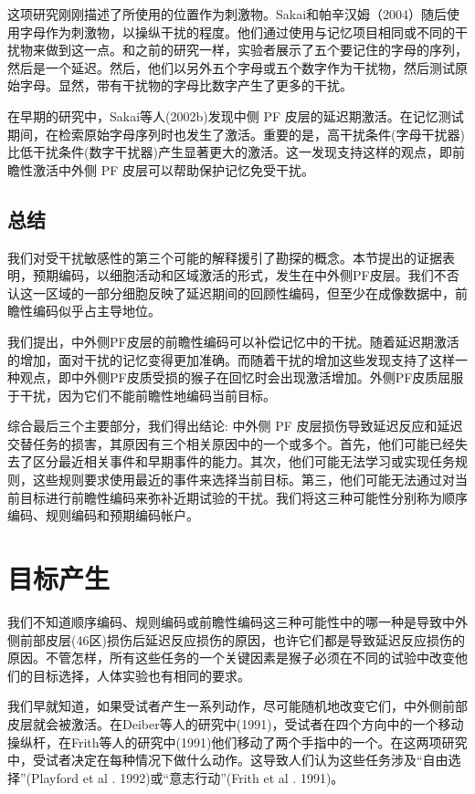 这项研究刚刚描述了所使用的位置作为刺激物。Sakai和帕辛汉姆（2004）随后使用字母作为刺激物，以操纵干扰的程度。他们通过使用与记忆项目相同或不同的干扰物来做到这一点。和之前的研究一样，实验者展示了五个要记住的字母的序列，然后是一个延迟。然后，他们以另外五个字母或五个数字作为干扰物，然后测试原始字母。显然，带有干扰物的字母比数字产生了更多的干扰。

在早期的研究中，Sakai等人(2002b)发现中侧 PF 皮层的延迟期激活。在记忆测试期间，在检索原始字母序列时也发生了激活。重要的是，高干扰条件(字母干扰器)比低干扰条件(数字干扰器)产生显著更大的激活。这一发现支持这样的观点，即前瞻性激活中外侧 PF 皮层可以帮助保护记忆免受干扰。
\subsection{总结}
我们对受干扰敏感性的第三个可能的解释援引了勘探的概念。本节提出的证据表明，预期编码，以细胞活动和区域激活的形式，发生在中外侧PF皮层。我们不否认这一区域的一部分细胞反映了延迟期间的回顾性编码，但至少在成像数据中，前瞻性编码似乎占主导地位。

我们提出，中外侧PF皮层的前瞻性编码可以补偿记忆中的干扰。随着延迟期激活的增加，面对干扰的记忆变得更加准确。而随着干扰的增加这些发现支持了这样一种观点，即中外侧PF皮质受损的猴子在回忆时会出现激活增加。外侧PF皮质屈服于干扰，因为它们不能前瞻性地编码当前目标。

综合最后三个主要部分，我们得出结论: 中外侧 PF 皮层损伤导致延迟反应和延迟交替任务的损害，其原因有三个相关原因中的一个或多个。首先，他们可能已经失去了区分最近相关事件和早期事件的能力。其次，他们可能无法学习或实现任务规则，这些规则要求使用最近的事件来选择当前目标。第三，他们可能无法通过对当前目标进行前瞻性编码来弥补近期试验的干扰。我们将这三种可能性分别称为顺序编码、规则编码和预期编码帐户。

\section{目标产生}
我们不知道顺序编码、规则编码或前瞻性编码这三种可能性中的哪一种是导致中外侧前部皮层(46区)损伤后延迟反应损伤的原因，也许它们都是导致延迟反应损伤的原因。不管怎样，所有这些任务的一个关键因素是猴子必须在不同的试验中改变他们的目标选择，人体实验也有相同的要求。

我们早就知道，如果受试者产生一系列动作，尽可能随机地改变它们，中外侧前部皮层就会被激活。在Deiber等人的研究中(1991)，受试者在四个方向中的一个移动操纵杆，在Frith等人的研究中(1991)他们移动了两个手指中的一个。在这两项研究中，受试者决定在每种情况下做什么动作。这导致人们认为这些任务涉及“自由选择”(Playford et al . 1992)或“意志行动”(Frith et al . 1991)。

